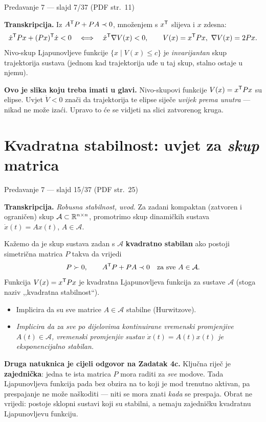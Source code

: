 \begin{izvor}{Predavanje 7 --- slajd 7/37 (PDF str.~11)}

\textbf{Transkripcija.} Iz $A^{\mathsf{T}} P + PA \prec 0$, množenjem s $x^{\mathsf{T}}$ slijeva i
$x$ zdesna:
\[
\dot{x}^{\mathsf{T}} P x + (Px)^{\mathsf{T}} \dot{x} < 0
\quad\Longleftrightarrow\quad
\dot{x}^{\mathsf{T}} \nabla V(x) < 0, \qquad V(x) = x^{\mathsf{T}} P x, \ \nabla V(x) = 2Px .
\]
Nivo-skup Ljapunovljeve funkcije $\{x \mid V(x) \leq c\}$ je \emph{invarijantan}
skup trajektorija sustava (jednom kad trajektorija uđe u taj skup, stalno ostaje
u njemu).

\textbf{Ovo je slika koju treba imati u glavi.} Nivo-skupovi funkcije
$V(x) = x^{\mathsf{T}} P x$ su elipse. Uvjet $\dot{V} < 0$ znači da trajektorija te
elipse siječe \emph{uvijek prema unutra} --- nikad ne može izaći. Upravo to će se
vidjeti na slici zatvorenog kruga.
\end{izvor}

\section{Kvadratna stabilnost: uvjet za \emph{skup} matrica}
\label{sec:z4-kvadratna}

\begin{izvor}{Predavanje 7 --- slajd 15/37 (PDF str.~25)}

\textbf{Transkripcija.} \emph{Robusna stabilnost, uvod.} Za zadani kompaktan
(zatvoren i ograničen) skup $\mathcal{A} \subset \mathbb{R}^{n\times n}$, promotrimo skup
dinamičkih sustava $\dot{x}(t) = Ax(t)$, $A \in \mathcal{A}$.

Kažemo da je skup sustava zadan s $\mathcal{A}$ \textbf{kvadratno stabilan} ako
postoji simetrična matrica $P$ takva da vrijedi
\[
P \succ 0, \qquad A^{\mathsf{T}} P + PA \prec 0 \quad \text{za sve } A \in \mathcal{A}.
\]
Funkcija $V(x) = x^{\mathsf{T}} P x$ je kvadratna Ljapunovljeva funkcija za sustave
$\mathcal{A}$ (stoga naziv ,,kvadratna stabilnost``).
\begin{itemize}[nosep,leftmargin=*]
  \item Implicira da su sve matrice $A \in \mathcal{A}$ stabilne (Hurwitzove).
  \item \emph{Implicira da za sve po dijelovima kontinuirane vremenski
        promjenjive $A(t) \in \mathcal{A}$, vremenski promjenjiv sustav
        $\dot{x}(t) = A(t)x(t)$ je eksponencijalno stabilan.}
\end{itemize}

\textbf{Druga natuknica je cijeli odgovor na Zadatak 4c.} Ključna riječ je
\textbf{zajednička}: jedna te ista matrica $P$ mora raditi za \emph{sve} modove.
Tada Ljapunovljeva funkcija pada bez obzira na to koji je mod trenutno aktivan,
pa prespajanje ne može naškoditi --- niti se mora znati \emph{kada} se prespaja.
Obrat ne vrijedi: postoje sklopni sustavi koji su stabilni, a nemaju zajedničku
kvadratnu Ljapunovljevu funkciju.
\end{izvor}

